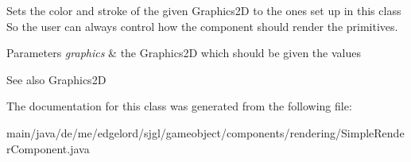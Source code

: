 Sets the color and stroke of the given Graphics2D to the ones set up in this class So the user can always control how the component should render the primitives.


\begin{DoxyParams}{Parameters}
{\em graphics} & the Graphics2D which should be given the values \\
\hline
\end{DoxyParams}
\begin{DoxySeeAlso}{See also}
Graphics2D 
\end{DoxySeeAlso}


The documentation for this class was generated from the following file\+:\begin{DoxyCompactItemize}
\item 
main/java/de/me/edgelord/sjgl/gameobject/components/rendering/Simple\+Render\+Component.\+java\end{DoxyCompactItemize}
